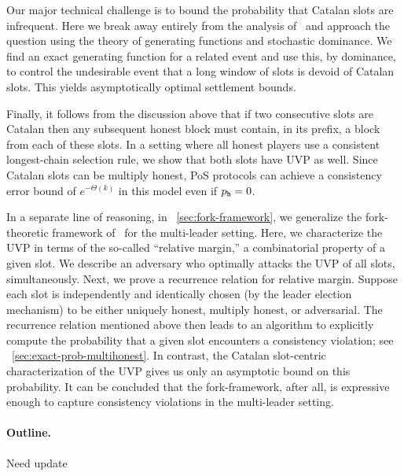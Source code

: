 Our major technical challenge is to bound the probability that Catalan
slots are infrequent. Here we break away entirely from the analysis
of~\cite{SnowWhite} and approach the question using the theory of
generating functions and stochastic dominance. We find an exact
generating function for a related event and use this, by dominance, to
control the undesirable event that a long window of slots is devoid of
Catalan slots. This yields
asymptotically optimal settlement bounds.

Finally, it follows from the discussion above that if two consecutive
slots are Catalan then any subsequent honest block must contain, in
its prefix, a block from each of these slots.  In a setting where all
honest players use a consistent longest-chain selection rule,
we show that both slots have UVP as well.  Since Catalan slots can be
multiply honest, PoS protocols can achieve a consistency error bound
of $e^{-\Theta(k)}$ in this model even if $p_{\mathtt{h}} = 0$.

In a separate line of reasoning, in \Section~\ref{sec:fork-framework}, 
we generalize the fork-theoretic framework of~\citet{LinearConsistency} for the multi-leader setting. 
Here, we characterize the UVP 
in terms of the so-called ``relative margin,'' 
a combinatorial property of a given slot. 
We describe an adversary who optimally attacks the UVP 
of all slots, simultaneously. 
Next, we prove a recurrence relation for relative margin. 
Suppose each slot is 
independently and identically chosen 
(by the leader election mechanism) 
to be either uniquely honest, multiply honest, or adversarial. 
The recurrence relation mentioned above then 
leads to an algorithm to explicitly compute 
the probability that 
a given slot encounters a consistency violation; 
see \Section~\ref{sec:exact-prob-multihonest}. 
In contrast, the Catalan slot-centric characterization of the UVP 
gives us only an asymptotic bound on this probability. 
It can be concluded that the fork-framework, after all, 
is expressive enough to capture consistency violations 
in the multi-leader setting.


\paragraph{Outline.}
{\color{red} Need update}

